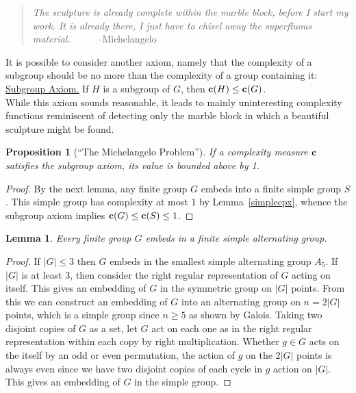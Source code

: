 \documentclass[a4paper,11pt]{amsart}
\newtheorem{lemma}[theorem]{Lemma}
\newtheorem{proposition}[theorem]{Proposition}
\theoremstyle{definition}
\renewcommand{\c}{\mbox{\bf c}}
\newcommand{\1}{{\mathbf 1}}
\begin{document}
\begin{quote}
 {\small \it   
The sculpture is already complete within the marble block, before I start my work. It is already there, I just have to chisel away the superfluous material.}  \ \ \ \ \ --Michelangelo
\end{quote}
\vspace{1em}

It is possible to consider another axiom, namely that the complexity of a subgroup should be no more than the complexity of a group containing it:\\[.5ex]

\underline{Subgroup Axiom.}  If $H$ is a subgroup of $G$, then $\c(H)\leq \c(G)$.\\[.5ex]

\noindent
While this axiom sounds reasonable, it leads to mainly uninteresting complexity functions reminiscent of detecting only the marble block in which a beautiful sculpture might be found. 

\begin{proposition}[``The Michelangelo Problem'']\label{cpx-no-subgroup}
If a complexity measure $\c$ satisfies the subgroup axiom, its value is bounded above by 1.
\end{proposition}
\begin{proof}
By the next lemma, any finite group $G$ embeds into a finite simple group $S$.   
This simple group has complexity at most $1$  by Lemma~\ref{simplecpx}, whence the subgroup axiom implies
$\c(G) \leq \c(S) \leq 1$.
\end{proof}

\begin{lemma}\label{EmbedInAlternatingGroup}
Every finite group $G$ embeds in a finite simple alternating group.
\end{lemma}
\begin{proof}  If $|G|\leq 3$ then $G$ embeds in the smallest simple alternating group $A_5$.
If $|G|$ is at least 3, then consider the right regular representation of $G$ acting on itself.
This gives an embedding of $G$ in the symmetric group on $|G|$ points. From this we can construct
an embedding of $G$ into an alternating group on $n=2|G|$ points, which is a simple group since $n\geq 5$ as
shown by Galois. Taking two disjoint copies of 
$G$ as a set, let $G$ act on each one as in the right regular representation within each copy by right multiplication.
Whether $g\in G$ acts on the itself by an odd or even permutation, the action of $g$ on the $2|G|$  points is always even since
we have two disjoint copies of each cycle  in $g$ action on $|G|$.  
This gives an embedding of $G$ in the simple group.
\end{proof}
\end{document}

